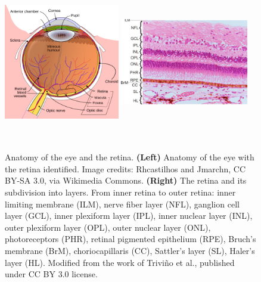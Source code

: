 \documentclass[12pt,a4paper]{journal}
\begin{document}
\begin{figure}[hb]
  \centering
  \includegraphics[width=0.45\textwidth, height=7cm]{ArchitectureEye} %
  \hfill
  \includegraphics[width=0.5\textwidth, height=7cm]{RetinalLayers}
  \caption{Anatomy of the eye and the retina. \textbf{(Left)} Anatomy of the eye with the retina identified. Image credits: Rhcastilhos and Jmarchn, CC BY-SA 3.0, via Wikimedia Commons. \textbf{(Right)} The retina and its subdivision into layers. From inner retina to outer retina: inner limiting membrane (ILM), nerve fiber layer (NFL), ganglion cell layer (GCL), inner plexiform layer (IPL), inner nuclear layer (INL), outer plexiform layer (OPL), outer nuclear layer (ONL), photoreceptors (PHR), retinal pigmented epithelium (RPE), Bruch's membrane (BrM), choriocapillaris (CC), Sattler's layer (SL), Haler's layer (HL). Modified from the work of Trivi\~no et al., published under CC BY 3.0 license.~\cite{Trivino_2012}}
  \label{fig:architecture-eye}
\end{figure}
\end{document}
